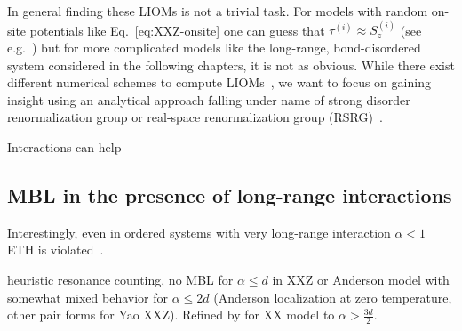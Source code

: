 In general finding these LIOMs is not a trivial task. For models with random on-site potentials like Eq.~\ref{eq:XXZ-onsite} one can guess that $\tau^{(i)}\approx S_z^{(i)}$ (see e.g.~\cite{adamiStructuralPropertiesLocal2022}) but for more complicated models like the long-range, bond-disordered system considered in the following chapters, it is not as obvious. While there exist different numerical schemes to compute LIOMs~\cite{chandranConstructingLocalIntegrals2015,mierzejewskiIdentifyingLocalQuasilocal2015,mierzejewskiApproximateConservationLaws2015,thomsonLocalIntegralsMotion2021,adamiStructuralPropertiesLocal2022}, we want to focus on gaining insight using an analytical approach falling under name of strong disorder renormalization group or real-space renormalization group (RSRG)~\cite{dasguptaLowtemperaturePropertiesRandom1980,fisherRandomAntiferromagneticQuantum1994,igloiStrongDisorderRG2005,voskManybodyLocalizationOne2013,voskTheoryManyBodyLocalization2015,igloiStrongDisorderRG2018}.








%

Interactions can help\cite{huangInteractionenhancedManybodyLocalization2024}


\subsection{MBL in the presence of long-range interactions}

Interestingly, even in ordered systems with very long-range interaction $\alpha<1$ ETH is violated~\cite{sugimotoEigenstateThermalizationLongRange2022,chengManybodyLocalizationClean2023}.

heuristic resonance counting, no MBL for $\alpha\leq d$ in XXZ \cite{yaoManyBodyLocalizationDipolar2014,burinManybodyDelocalizationStrongly2015,gutmanEnergyTransportAnderson2016} or Anderson model \cite{burinEnergyDelocalizationStrongly2006} with somewhat mixed behavior for $\alpha\leq 2d$ (Anderson localization at zero temperature, other pair forms for Yao XXZ). Refined by \cite{burinLocalizationRandomXY2015} for XX model to $\alpha > \frac{3d}{2}$.

